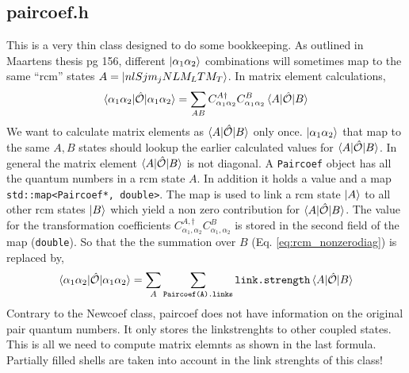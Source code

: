 \documentclass[10pt]{article}
\begin{document}
\subsection{paircoef.h}
\label{ssec:paircoef}
This is a very thin class designed to do some bookkeeping. As outlined in Maartens thesis pg 156, different $\ket{\alpha_1 \alpha_2}$ combinations will sometimes map to the same ``rcm'' states $A = \ket{ nlSjm_j NLM_L TM_T}$. In matrix element calculations,
\begin{align}
	\braket{\alpha_1 \alpha_2 | \hat{\mathcal{O}} | \alpha_1 \alpha_2} = \sum_{AB} C_{\alpha_1 \alpha_2}^{A \dagger} C_{\alpha_1 \alpha_2}^{B} \braket {A | \hat{\mathcal{O}} | B }
	\label{eq:rcm_nonzerodiag}
\end{align}
We want to calculate matrix elements as $\braket{ A | \hat{\mathcal{O}} | B}$ only once. $\ket{\alpha_1 \alpha_2}$ that map to the same $A,B$ states should lookup the earlier calculated values for $\braket{ A | \hat{\mathcal{O}} | B}$.
In general the matrix element $\braket{ A | \hat{\mathcal{O}} | B }$ is not diagonal. 
A \texttt{Paircoef} object has all the quantum numbers in a rcm state $A$. In addition it holds a value and a map \texttt{ std::map<Paircoef*, double>}. The map is used to link a rcm state $\ket{A}$ to all other rcm states $\ket{B}$ which yield a non zero contribution for $\braket{ A | \hat{\mathcal{O}} | B }$. The value for the transformation coefficients $C_{\alpha_1,\alpha_2}^{A,\dagger} C_{\alpha_1,\alpha_2}^{B}$ is stored in the second field of the map (\texttt{double}). So that the the summation over $B$ (Eq. \ref{eq:rcm_nonzerodiag}) is replaced by,
\begin{align}
	\braket{\alpha_1 \alpha_2 | \hat{\mathcal{O}} | \alpha_1 \alpha_2} = \sum_{A} \sum_{\texttt{Paircoef(A).links}}  \texttt{link.strength} \braket {A | \hat{\mathcal{O}} | B }
\end{align}
Contrary to the Newcoef class, paircoef does not have information on the 
original pair quantum numbers.  It only stores the linkstrenghts to other 
coupled states.  This is all we need to compute matrix elemnts as shown in the 
last formula.  Partially filled shells are taken into account in the link 
strenghts of this class!
\end{document}
